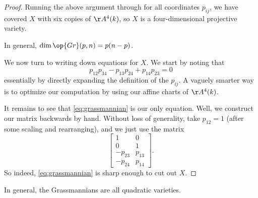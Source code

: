 \documentclass[../notes.tex]{subfiles}
\begin{document}
\begin{proof}
	Running the above argument through for all coordinates $p_{ij}$, we have covered $X$ with six copies of $\AA^4(k)$, so $X$ is a four-dimensional projective variety.
	\begin{remark}
		In general, $\dim\op{Gr}(p,n)=p(n-p)$.
	\end{remark}
	We now turn to writing down equations for $X$. We start by noting that
	\[p_{12}p_{34}-p_{13}p_{24}+p_{14}p_{23}=0\tag{$*$}\label{eq:grassmannian}\]
	essentially by directly expanding the definition of the $p_{ij}$. A vaguely smarter way is to optimize our computation by using our affine charts of $\AA^4(k)$.

	It remains to see that \autoref{eq:grassmannian} is our only equation. Well, we construct our matrix backwards by hand. Without loss of generality, take $p_{12}=1$ (after some scaling and rearranging), and we just use the matrix
	\[\begin{bmatrix}
		1 & 0 \\
		0 & 1 \\
		-p_{23} & p_{13} \\
		-p_{24} & p_{14}
	\end{bmatrix}.\]
	So indeed, \autoref{eq:grassmannian} is sharp enough to cut out $X$.
\end{proof}
\begin{remark}
	In general, the Grassmannians are all quadratic varieties.
\end{remark}
\end{document}
